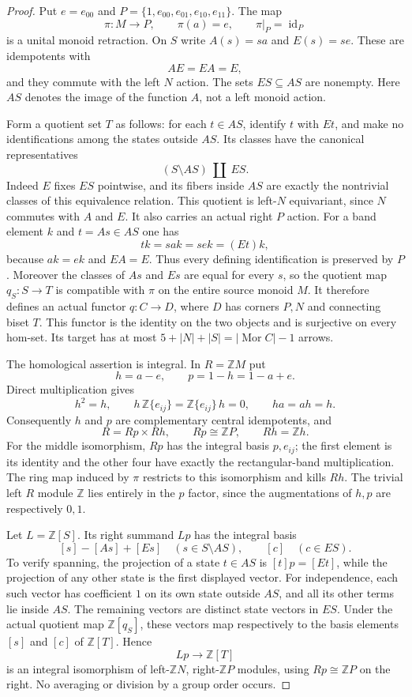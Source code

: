 \begin{proof}
Put $e=e_{00}$ and $P=\{1,e_{00},e_{01},e_{10},e_{11}\}$.
The map
\[
 \pi:M\longrightarrow P,\qquad \pi(a)=e,
 \qquad \pi|_P=\operatorname{id}_P
\]
is a unital monoid retraction.  On $S$ write $A(s)=sa$ and $E(s)=se$.
These are idempotents with
\[
 A E=E A=E,
\]
and they commute with the left $N$ action.  The sets $ES\subseteq AS$
are nonempty.  Here $AS$ denotes the image of the function $A$, not
a left monoid action.

Form a quotient set $T$ as follows: for each $t\in AS$, identify $t$
with $Et$, and make no identifications among the states outside $AS$.
Its classes have the canonical representatives
\[
 (S\setminus AS)\ \amalg\ ES.
\]
Indeed $E$ fixes $ES$ pointwise, and its fibers inside $AS$ are exactly
the nontrivial classes of this equivalence relation.  This quotient
is left-$N$ equivariant, since $N$ commutes with $A$ and $E$.
It also carries an actual right $P$ action.  For a band element $k$
and $t=As\in AS$ one has
\[
 tk=sak=sek=(Et)k,
\]
because $ak=ek$ and $EA=E$.  Thus every defining identification is
preserved by $P$.  Moreover the classes of $As$ and $Es$ are equal
for every $s$, so the quotient map $q_S:S\to T$ is compatible with
$\pi$ on the entire source monoid $M$.  It therefore defines an
actual functor $q:C\to D$, where $D$ has corners $P,N$ and connecting
biset $T$.  This functor is the identity on the two objects and is
surjective on every hom-set.  Its target has at most
$5+|N|+|S|=|\operatorname{Mor}C|-1$ arrows.

The homological assertion is integral.  In $R=\mathbb ZM$ put
\[
 h=a-e,\qquad p=1-h=1-a+e.
\]
Direct multiplication gives
\[
 h^2=h,\qquad h\,\mathbb Z\{e_{ij}\}
   =\mathbb Z\{e_{ij}\}\,h=0,\qquad ha=ah=h.
\]
Consequently $h$ and $p$ are complementary central idempotents,
and
\[
 R=Rp\times Rh,\qquad Rp\cong\mathbb ZP,\qquad Rh=\mathbb Zh.
\]
For the middle isomorphism, $Rp$ has the integral basis $p,e_{ij}$;
the first element is its identity and the other four have exactly
the rectangular-band multiplication.  The ring map induced by
$\pi$ restricts to this isomorphism and kills $Rh$.  The trivial
left $R$ module $\mathbb Z$ lies entirely in the $p$ factor, since
the augmentations of $h,p$ are respectively $0,1$.

Let $L=\mathbb Z[S]$.  Its right summand $Lp$ has the integral basis
\[
 [s]-[As]+[Es]\quad(s\in S\setminus AS),
 \qquad [c]\quad(c\in ES).
\]
To verify spanning, the projection of a state $t\in AS$ is
$[t]p=[Et]$, while the projection of any other state is the first
displayed vector.  For independence, each such vector has coefficient
$1$ on its own state outside $AS$, and all its other terms lie inside
$AS$.  The remaining vectors are distinct state vectors in $ES$.
Under the actual quotient map $\mathbb Z[q_S]$, these vectors map
respectively to the basis elements $[s]$ and $[c]$ of $\mathbb Z[T]$.
Hence
\[
 Lp\longrightarrow\mathbb Z[T]
\]
is an integral isomorphism of left-$\mathbb ZN$, right-$\mathbb ZP$
modules, using $Rp\cong\mathbb ZP$ on the right.  No averaging or
division by a group order occurs.


\end{proof}
